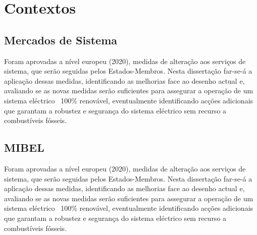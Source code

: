 \chapter{Contextos}

\section{Mercados de Sistema \label{se:mercados}}
\cite{Lopes2021}
\cite{Watson1984}
\citep{Schweppe1988}
Foram aprovadas a nível europeu (2020), medidas de alteração aos serviços de sistema, que serão seguidas pelos Estados-Membros. Nesta dissertação far-se-á a aplicação dessas medidas, identificando as melhorias face ao desenho actual e, avaliando se as novas medidas serão suficientes para assegurar a operação de um sistema eléctrico ~100\% renovável, eventualmente identificando acções adicionais que garantam a robustez e segurança do sistema eléctrico sem recurso a combustíveis fósseis.

\section{MIBEL \label{se:mibel}}
\cite{Bessa2012}
\cite{Carneiro2016}
\cite{Fernandes2016}
\citep{Agostini2021}
Foram aprovadas a nível europeu (2020), medidas de alteração aos serviços de sistema, que serão seguidas pelos Estados-Membros. Nesta dissertação far-se-á a aplicação dessas medidas, identificando as melhorias face ao desenho actual e, avaliando se as novas medidas serão suficientes para assegurar a operação de um sistema eléctrico ~100\% renovável, eventualmente identificando acções adicionais que garantam a robustez e segurança do sistema eléctrico sem recurso a combustíveis fósseis.